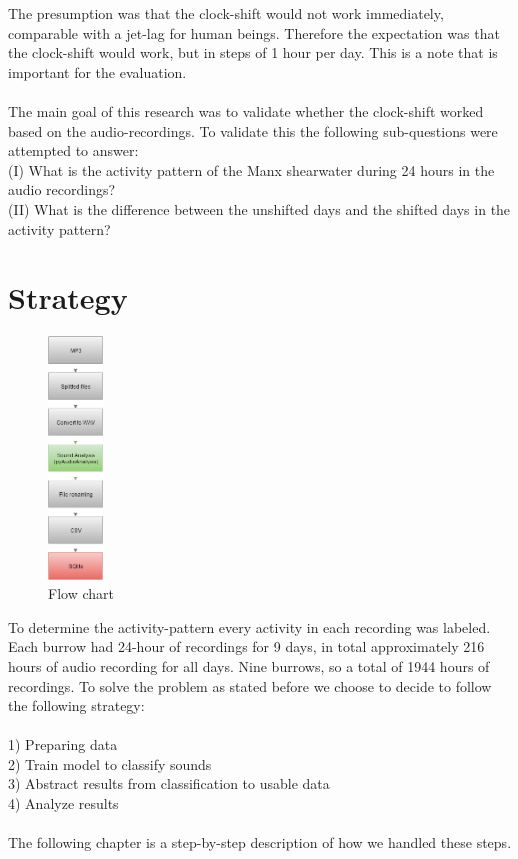 \documentclass[a4paper]{article}
\begin{document}
The presumption was that the clock-shift would not work immediately, comparable with a jet-lag for human beings. Therefore the expectation was that the clock-shift would work, but in steps of 1 hour per day. This is a note that is important for the evaluation.\\\\
The main goal of this research was to validate whether the clock-shift worked based on the audio-recordings. To validate this the following sub-questions were attempted to answer:\\
 (I)    What is the activity pattern of the Manx shearwater during 24 hours in the audio recordings? \\
 (II)   What is the difference between the unshifted days and the shifted days in the activity pattern?
 
\section*{Strategy}
\begin{figure}
\vspace{-23pt}
  \begin{center}
    \includegraphics[width=0.13\textwidth]{diagram}
  \end{center}
  \vspace{-20pt}
  \caption{Flow chart}
\end{figure}
To determine the activity-pattern every activity in each recording was labeled. Each burrow had 24-hour of recordings for 9 days, in total approximately 216 hours of audio recording for all days. Nine burrows, so a total of 1944 hours of recordings. To solve the problem as stated before we choose to decide to follow the following strategy:\\\\
1) Preparing data \\
2) Train model to classify sounds \\
3) Abstract results from classification to usable data\\
4) Analyze results\\\\
The following chapter is a step-by-step description of how we handled these steps. 
\end{document}
